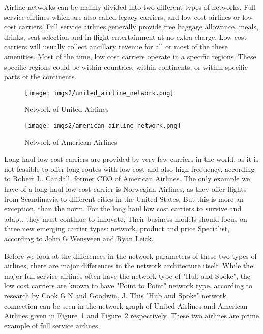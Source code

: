 \documentclass[twocolumn]{tum-article}
\begin{document}
Airline networks can be mainly divided into two different types of networks. Full service airlines which are also called legacy carriers, and low cost airlines or low cost carriers.  
Full service airlines generally provide free baggage allowance, meals, drinks, seat selection and in-flight entertainment at no extra charge.
Low cost carriers will usually collect ancillary revenue for all or most of the these amenities.
Most of the time, low cost carriers operate in a specific regions.
These specific regions could be within countries, within continents, or within specific parts of the continents.

\begin{figure}
        \centering
        \texttt{[image: imgs2/united\_airline\_network.png]}
        \caption{
Network of United Airlines}
        \label{fig:united_airline}
\end{figure}

\begin{figure}
        \centering
        \texttt{[image: imgs2/american\_airline\_network.png]}
        \caption{
Network of American Airlines}
        \label{fig:american_airline}
\end{figure}



Long haul low cost carriers are provided by very few carriers in the world, as it is not feasible to offer long routes with low cost and also high frequency, according to Robert L. Candall, former CEO of American Airlines.\cite{long_haul_lcc_model}
The only example we have of a long haul low cost carrier is Norwegian Airlines, as they offer flights from Scandinavia to different cities in the United States.
But this is more an exception, than the norm. For the long haul low cost carriers to survive and adapt, they must continue to innovate. Their business models should focus on three new emerging carrier types: network, product and price Specialist, according to John G.Wensveen and Ryan Leick.\cite{long_haul_lcc_new_model}


Before we look at the differences in the network parameters of these two types of airlines, there are major differences in the network architecture itself.
While the major full service airlines often have the network type of "Hub and Spoke", the low cost carriers are known to have "Point to Point" network type, according to research by Cook G.N and Goodwin, J.\cite{airline_network_comparison}
This "Hub and Spoke" network connection can be seen in the network graph of United Airlines and American Airlines given in Figure~\ref{fig:united_airline} and Figure~\ref{fig:american_airline} respectively. These two airlines are prime example of full service airlines. 
\end{document}
